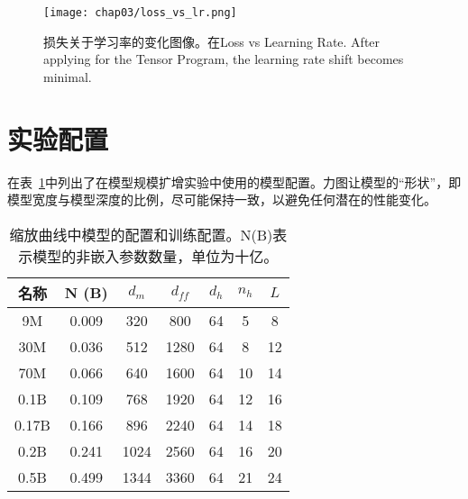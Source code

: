 \begin{figure}[htbp]
  \centering
      \centering
      \texttt{[image: chap03/loss\_vs\_lr.png]}
      \caption{损失关于学习率的变化图像。在Loss vs Learning Rate. After applying for the Tensor Program, the learning rate shift becomes minimal.}
      \label{fig:loss_vs_lr}
\end{figure}


\section{实验配置}
在表~\ref{tab:appmodel_configs}中列出了在模型规模扩增实验中使用的模型配置。力图让模型的“形状”，即模型宽度与模型深度的比例，尽可能保持一致，以避免任何潜在的性能变化。

\begin{table}[htbp]
    \centering
    \begin{tabular}{c|cccccc}
    \toprule
        \textbf{名称} & \textbf{N (B)}& $d_m$ & $d_{ff}$ &$d_h$ & $n_h$ & $L$ \\
    \midrule
          9M    &  0.009 & 320 & 800 & 64 & 5 & 8\\
           30M &   0.036 & 512 & 1280 & 64 & 8 & 12  \\
          70M &  0.066 & 640 & 1600 & 64 & 10 & 14\\
          0.1B &  0.109 & 768 & 1920 & 64 & 12 & 16  \\
         0.17B &  0.166 & 896 & 2240 & 64 & 14 & 18 \\
         0.2B&  0.241 & 1024 & 2560 & 64 & 16 & 20 \\
        0.5B& 0.499 & 1344 & 3360 & 64 & 21 & 24 \\
    \bottomrule
    \end{tabular}
    \caption{缩放曲线中模型的配置和训练配置。N(B)表示模型的非嵌入参数数量，单位为十亿。
    }
    \label{tab:appmodel_configs}
\end{table}